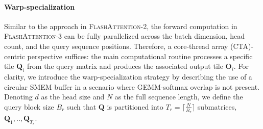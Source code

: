 \begin{enumerate}
\paragraph{Warp-specialization}
Similar to the approach in \textsc{FlashAttention-2}, the forward computation in \textsc{FlashAttention-3} can be fully parallelized across the batch dimension, head count, and the query sequence positions. Therefore, a core-thread array (CTA)-centric perspective suffices: the main computational routine processes a specific tile $\mathbf{Q}_i$ from the query matrix and produces the associated output tile $\mathbf{O}_i$. For clarity, we introduce the warp-specialization strategy by describing the use of a circular SMEM buffer in a scenario where GEMM-softmax overlap is not present. Denoting $d$ as the head size and $N$ as the full sequence length, we define the query block size $B_r$ such that $\mathbf{Q}$ is partitioned into $T_r = \lceil \frac{N}{B_r} \rceil$ submatrices, $\mathbf{Q}_1, .., \mathbf{Q}_{T_r}$.


\end{enumerate}
